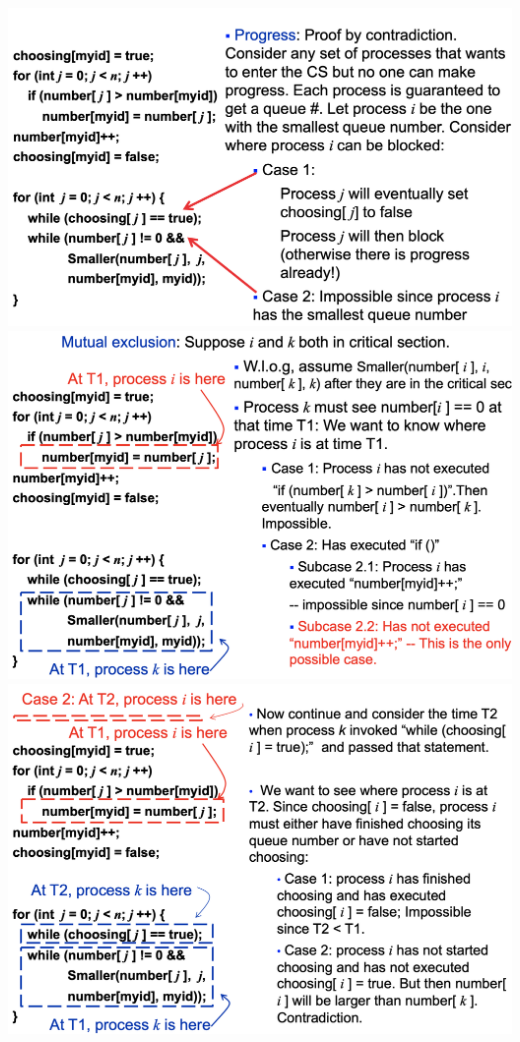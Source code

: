 \documentclass[10pt, landscape]{article}
\begin{document}
\begin{multicols*}{3}
  \begin{tightcenter}
    \includegraphics[width=0.95\linewidth]{cs4231-lamports-bakery-proof-1.png} 
    \includegraphics[width=0.95\linewidth]{cs4231-lamports-bakery-proof-2.png} 
    \includegraphics[width=0.95\linewidth]{cs4231-lamports-bakery-proof-3.png} 
  \end{tightcenter}


\end{multicols*}
\end{document}
